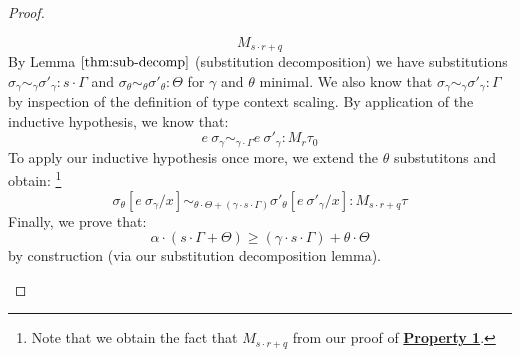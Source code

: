 \begin{proof}
\begin{description}
\begin{description}
$$          M_{s \cdot r + q}$$
          By Lemma $\ref{thm:sub-decomp}$ (substitution decomposition) we have
          substitutions 
          $\sigma_{\gamma} \sim_{\gamma} \sigma'_{\gamma} : s \cdot \Gamma$
          and $\sigma_{\theta} \sim_{\theta} \sigma'_{\theta} : \Theta$ for
          $\gamma$ and $\theta$ minimal. 
          We also know that 
          $\sigma_{\gamma} \sim_{\gamma} \sigma'_{\gamma} : \Gamma$ by
          inspection of the definition of type context scaling.
          By application of the inductive hypothesis, we know that:
          $$e~\sigma_{\gamma} \sim_{\gamma \cdot \Gamma} e~\sigma'_{\gamma} :
          M_r \tau_0 $$
          To apply our inductive hypothesis once more, we extend the $\theta$
          substutitons and obtain:
          \footnote{Note that we obtain the fact that $M_{s \cdot r + q}$ from our proof
          of \textbf{\underline{Property 1}}.}
          $$\sigma_{\theta}[e~\sigma_{\gamma}/x] \sim_{\theta \cdot \Theta + (\gamma \cdot s \cdot \Gamma)}\sigma'_{\theta}[e~\sigma'_{\gamma}/x] : M_{s \cdot r + q} \tau$$
          Finally, we prove that:
          $$
          \alpha \cdot (s \cdot \Gamma + \Theta) \geq
          (\gamma \cdot s \cdot \Gamma) + \theta \cdot \Theta
          $$
          by construction (via our substitution decomposition lemma).

      \end{description}
  \end{description}
\end{proof}

%
